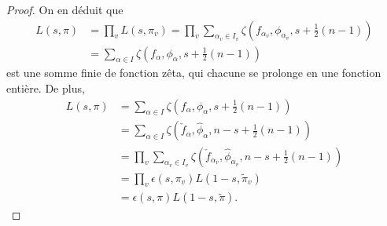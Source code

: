 \begin{proof}
On en déduit que
\begin{align}
L(s, \pi) &= \prod_v L(s, \pi_v) = \prod_v \sum_{\alpha_v \in I_v} \zeta(f_{\alpha_v}, \phi_{\alpha_v}, s + \frac{1}{2}(n-1)) \\
&= \sum_{\alpha \in I} \zeta(f_\alpha, \phi_\alpha, s + \frac{1}{2}(n-1))
\end{align}
est une somme finie de fonction zêta, qui chacune se prolonge en une fonction entière. De plus,
\begin{align}
L(s, \pi) &= \sum_{\alpha \in I} \zeta(f_\alpha, \phi_\alpha, s + \frac{1}{2}(n-1)) \\
&= \sum_{\alpha \in I} \zeta(\check{f}_\alpha, \hat{\phi}_\alpha, n - s + \frac{1}{2}(n-1)) \\
&= \prod_v \sum_{\alpha_v \in I_v} \zeta(\check{f}_{\alpha_v}, \hat{\phi}_{\alpha_v}, n-s + \frac{1}{2}(n-1)) \\
&= \prod_v \epsilon(s, \pi_v) L(1-s, \tilde{\pi}_v) \\
&= \epsilon(s, \pi)L(1-s, \tilde{\pi}).
\end{align}
\end{proof}